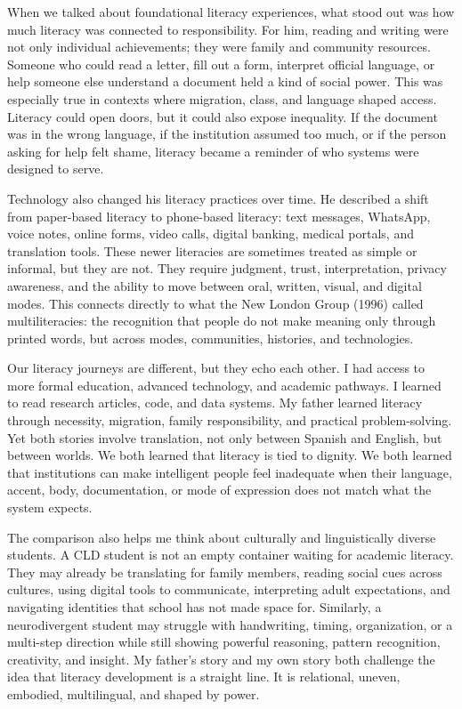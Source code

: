 \documentclass[11pt]{article}
\begin{document}
When we talked about foundational literacy experiences, what stood out was how much literacy was connected to responsibility. For him, reading and writing were not only individual achievements; they were family and community resources. Someone who could read a letter, fill out a form, interpret official language, or help someone else understand a document held a kind of social power. This was especially true in contexts where migration, class, and language shaped access. Literacy could open doors, but it could also expose inequality. If the document was in the wrong language, if the institution assumed too much, or if the person asking for help felt shame, literacy became a reminder of who systems were designed to serve.

Technology also changed his literacy practices over time. He described a shift from paper-based literacy to phone-based literacy: text messages, WhatsApp, voice notes, online forms, video calls, digital banking, medical portals, and translation tools. These newer literacies are sometimes treated as simple or informal, but they are not. They require judgment, trust, interpretation, privacy awareness, and the ability to move between oral, written, visual, and digital modes. This connects directly to what the New London Group (1996) called multiliteracies: the recognition that people do not make meaning only through printed words, but across modes, communities, histories, and technologies.

Our literacy journeys are different, but they echo each other. I had access to more formal education, advanced technology, and academic pathways. I learned to read research articles, code, and data systems. My father learned literacy through necessity, migration, family responsibility, and practical problem-solving. Yet both stories involve translation, not only between Spanish and English, but between worlds. We both learned that literacy is tied to dignity. We both learned that institutions can make intelligent people feel inadequate when their language, accent, body, documentation, or mode of expression does not match what the system expects.

The comparison also helps me think about culturally and linguistically diverse students. A CLD student is not an empty container waiting for academic literacy. They may already be translating for family members, reading social cues across cultures, using digital tools to communicate, interpreting adult expectations, and navigating identities that school has not made space for. Similarly, a neurodivergent student may struggle with handwriting, timing, organization, or a multi-step direction while still showing powerful reasoning, pattern recognition, creativity, and insight. My father's story and my own story both challenge the idea that literacy development is a straight line. It is relational, uneven, embodied, multilingual, and shaped by power.
\end{document}
